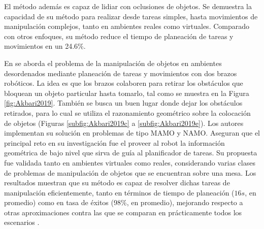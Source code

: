 El método además es capaz de lidiar con oclusiones de objetos.
Se demuestra la capacidad de su método para realizar desde tareas simples, hasta movimientos de manipulación complejos, tanto en ambientes reales como virtuales.
Comparado con otros enfoques, su método reduce el tiempo de planeación de tareas y movimientos en un 24.6\!\%.

En \cite{Akbari2019} se aborda el problema de la manipulación de objetos en ambientes desordenados mediante planeación de tareas y movimientos con dos brazos robóticos. 
La idea es que los brazos colaboren para retirar los obstáculos que bloquean un objeto particular hasta tomarlo, tal como se muestra en la Figura \ref{fig:Akbari2019}. 
También se busca un buen lugar donde dejar los obstáculos retirados, para lo cual se utiliza el razonamiento geométrico sobre la colocación de objetos (Figuras \ref{subfig:Akbari2019c} a \ref{subfig:Akbari2019e}). 
Los autores implementan su solución en problemas de tipo MAMO y NAMO.
Aseguran que el principal reto en su investigación fue el proveer al robot la información geométrica de bajo nivel que sirva de guía al planificador de tareas.
Su propuesta fue validada tanto en ambientes virtuales como reales, considerando varias clases de problemas de manipulación de objetos que se encuentran sobre una mesa.
Los resultados muestran que su método es capaz de resolver dichas tareas de manipulación eficientemente, tanto en términos de tiempo de planeación ($16s$, en promedio) como en tasa de éxitos (98\!\%, en promedio), mejorando respecto a otras aproximaciones contra las que se comparan en prácticamente todos los escenarios .
%
